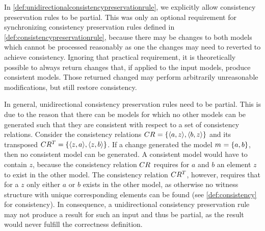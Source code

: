 In \autoref{def:unidirectionalconsistencypreservationrule}, we explicitly allow consistency preservation rules to be partial.
This was only an optional requirement for synchronizing consistency preservation rules defined in \autoref{def:consistencypreservationrule}, because there may be changes to both models which cannot be processed reasonably as one the changes may need to reverted to achieve consistency.
Ignoring that practical requirement, it is theoretically possible to always return changes that, if applied to the input models, produce consistent models.
Those returned changed may perform arbitrarily unreasonable modifications, but still restore consistency.

In general, unidirectional consistency preservation rules need to be partial.
This is due to the reason that there can be models for which no other models can be generated such that they are consistent with respect to a set of consistency relations.
Consider the consistency relations $CR_{} = \{ \langle a, z \rangle, \langle b, z \rangle \}$ and its transposed $CR_{}^T = \{ \langle z, a \rangle, \langle z, b \rangle \}$.
If a change generated the model $m_{} = \{ a, b \}$, then no consistent model can be generated.
A consistent model would have to contain $z$, because the consistency relation $CR_{}$ requires for $a$ and $b$ an element $z$ to exist in the other model.
The consistency relation $CR_{}^T$, however, requires that for a $z$ only either $a$ or $b$ exists in the other model, as otherwise no witness structure with unique corresponding elements can be found (see \autoref{def:consistency} for consistency).
In consequence, a unidirectional consistency preservation rule may not produce a result for such an input and thus be partial, as the result would never fulfill the correctness definition.


